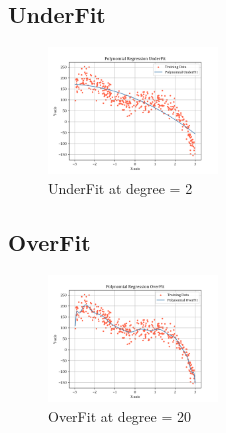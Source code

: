 \subsection{UnderFit}
\begin{figure}[H]
  \centering
  \includegraphics[width=0.4\textwidth]{assets/images/3_underfit.png}
  \caption{UnderFit at degree = 2}
\end{figure}

\subsection{OverFit}
\begin{figure}[H]
  \centering
  \includegraphics[width=0.4\textwidth]{assets/images/3_overfit.png}
  \caption{OverFit at degree = 20}
\end{figure}
